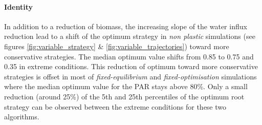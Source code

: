 %

\paragraph{Identity}

In addition to a reduction of biomass, the increasing slope of the water influx reduction lead to a shift of the optimum strategy in \textit{non plastic} simulations (see figures \ref{fig:variable_strategy} \&  \ref{fig:variable_trajectories}) toward more conservative strategies. The median optimum value shifts from 0.85 to 0.75 and 0.35 in extreme conditions. This reduction of optimum toward more conservative strategies is offset in most of \textit{fixed-equilibrium} and \textit{fixed-optimisation} simulations where the median optimum value for the PAR stays above 80\%. Only a small reduction (around 25\%) of the 5th and 25th percentiles of the optimum root strategy can be observed between the extreme conditions for these two algorithms.

